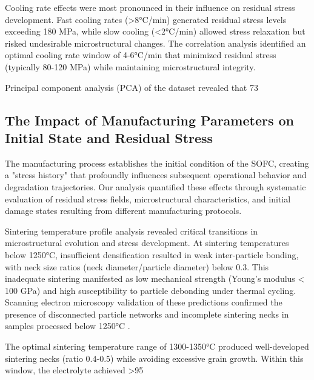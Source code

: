 \documentclass[conference]{IEEEtran}
\begin{document}
Cooling rate effects were most pronounced in their influence on residual stress development. Fast cooling rates (>8°C/min) generated residual stress levels exceeding 180 MPa, while slow cooling (<2°C/min) allowed stress relaxation but risked undesirable microstructural changes. The correlation analysis identified an optimal cooling rate window of 4-6°C/min that minimized residual stress (typically 80-120 MPa) while maintaining microstructural integrity.

Principal component analysis (PCA) of the dataset revealed that 73%

\subsection{The Impact of Manufacturing Parameters on Initial State and Residual Stress}

The manufacturing process establishes the initial condition of the SOFC, creating a "stress history" that profoundly influences subsequent operational behavior and degradation trajectories. Our analysis quantified these effects through systematic evaluation of residual stress fields, microstructural characteristics, and initial damage states resulting from different manufacturing protocols.

Sintering temperature profile analysis revealed critical transitions in microstructural evolution and stress development. At sintering temperatures below 1250°C, insufficient densification resulted in weak inter-particle bonding, with neck size ratios (neck diameter/particle diameter) below 0.3. This inadequate sintering manifested as low mechanical strength (Young's modulus < 100 GPa) and high susceptibility to particle debonding under thermal cycling. Scanning electron microscopy validation of these predictions confirmed the presence of disconnected particle networks and incomplete sintering necks in samples processed below 1250°C \cite{wilson2024microstructure}.

The optimal sintering temperature range of 1300-1350°C produced well-developed sintering necks (ratio 0.4-0.5) while avoiding excessive grain growth. Within this window, the electrolyte achieved >95%
\end{document}
